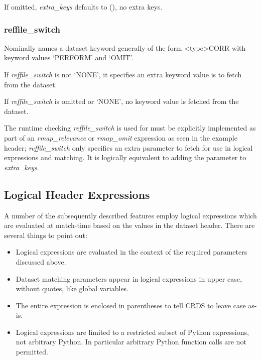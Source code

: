 \documentclass[letterpaper,10pt,english]{sphinxmanual}
\begin{document}
If omitted, \emph{extra\_keys} defaults to (),  no extra keys.


\subsubsection{reffile\_switch}
\label{rmap_syntax:reffile-switch}
Nominally names a dataset keyword generally of the form \textless{}type\textgreater{}CORR with keyword values `PERFORM' and `OMIT'.

If \emph{reffile\_switch} is not `NONE',  it specifies an extra keyword value is to fetch from the dataset.

If \emph{reffile\_switch} is omitted or `NONE',  no keyword value is fetched from the dataset.

The runtime checking \emph{reffile\_switch} is used for must be explicitly implemented as part of an \emph{rmap\_relevance} or
\emph{rmap\_omit} expression as seen in the example header; \emph{reffile\_switch} only specifies an extra parameter to fetch
for use in logical expressions and matching.  It is logically equivalent to adding the parameter to \emph{extra\_keys}.


\subsection{Logical Header Expressions}
\label{rmap_syntax:logical-header-expressions}
A number of the subsequently described features employ logical expressions which are evaluated at match-time
based on the values in the dataset header.  There are several things to point out:
\begin{itemize}
\item {} 
Logical expressions are evaluated in the context of the required parameters discussed above.

\item {} 
Dataset matching parameters appear in logical expressions in upper case,  without quotes, like global variables.

\item {} 
The entire expression is enclosed in parentheses to tell CRDS to leave case as-is.

\item {} 
Logical expressions are limited to a restricted subset of Python expressions,  not arbitrary Python.  In particular
arbitrary Python function calls are not permitted.

\end{itemize}
\end{document}
